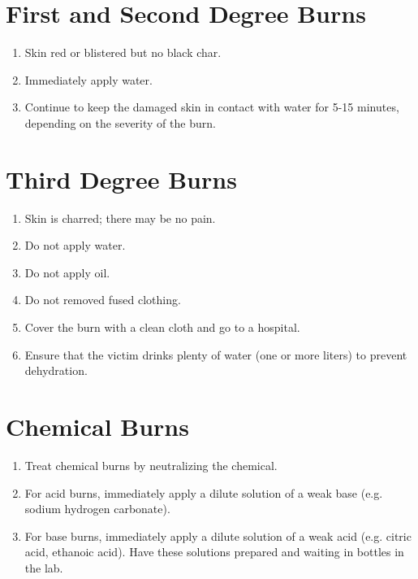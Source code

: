 \section{First and Second Degree Burns}

\begin{enumerate}
\item{Skin red or blistered but no black char.}
\item{Immediately apply water.}
\item{Continue to keep the damaged skin in contact with water for 5-15 minutes, 
depending on the severity of the burn.}
\end{enumerate}

\section{Third Degree Burns}

\begin{enumerate}
\item{Skin is charred; there may be no pain.}
\item{Do not apply water.}
\item{Do not apply oil.}
\item{Do not removed fused clothing.}
\item{Cover the burn with a clean cloth and go to a hospital.}
\item{Ensure that the victim drinks plenty of water (one or more liters) 
to prevent dehydration.}
\end{enumerate}

\section{Chemical Burns}

\begin{enumerate}
\item{Treat chemical burns by neutralizing the chemical.}
\item{For acid burns, immediately apply a dilute solution of a weak base 
(e.g. sodium hydrogen carbonate).}
\item{For base burns, immediately apply a dilute solution of a weak acid 
(e.g. citric acid, ethanoic acid). 
Have these solutions prepared and waiting in bottles in the lab.}
\end{enumerate}

